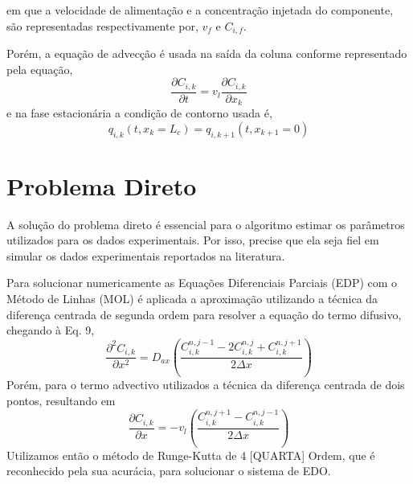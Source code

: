 \documentclass[por]{Template_SBEF}
\begin{document}
em que a velocidade de alimentação e a concentração injetada do componente, são representadas respectivamente por, $v_f$ e $C_{i,f}$.

Porém, a equação de advecção é usada na saída da coluna conforme \cite{haag} representado pela equação,
\begin{equation}
\frac{\partial C_{i,k}}{\partial t} = v_l \frac{\partial C_{i,k}}{\partial x_k}
\end{equation}
 e na fase estacionária a condição de contorno usada é,
 \begin{equation}
 q_{i,k}(t,x_k = L_c) = q_{i,k+1}(t, x_{k+1} = 0)
 \end{equation}

\section{Problema Direto}
A solução do problema direto é essencial para o algoritmo estimar os parâmetros utilizados para os dados experimentais. Por isso, precise que ela seja fiel em simular os dados experimentais reportados na literatura.

Para solucionar numericamente as Equações Diferenciais Parciais (EDP) com o Método de Linhas (MOL) é aplicada a aproximação utilizando a técnica da diferença centrada de segunda ordem para resolver a equação do termo difusivo, chegando à Eq. 9,
\begin{equation}
\frac{\partial^2 C_{i,k}}{\partial x^2} = D_{ax}(\frac{C_{i,k}^{n,j-1} - 2C_{i,k}^{n,j} + C_{i,k}^{n,j+1}}{2\Delta x})
\end{equation}
Porém, para o termo advectivo utilizados a técnica da diferença centrada de dois pontos, resultando em
\begin{equation}
\frac{\partial C_{i,k}}{\partial x} = - v_l (\frac{C_{i,k}^{n,j+1} - C_{i,k}^{n,j-1}}{2\Delta x})
\end{equation}
Utilizamos então o método de Runge-Kutta de 4 [QUARTA] Ordem, que é reconhecido pela sua acurácia, para solucionar o sistema de EDO.
\end{document}
